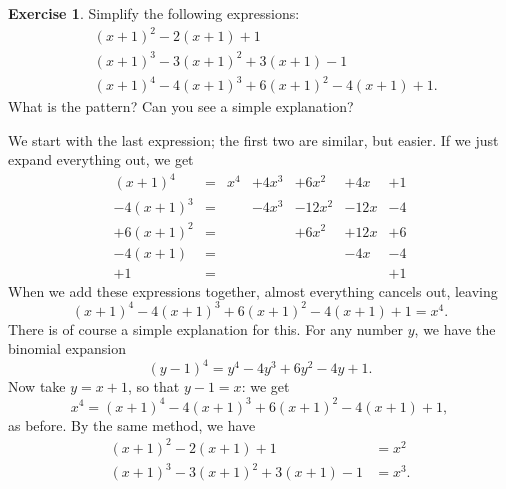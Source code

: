 \documentclass[a4paper]{book}
\renewcommand{\:}{\colon}
\theoremstyle{definition}
\newtheorem{exercise}[theorem]{Exercise}
\renewenvironment{solution}{\SolutionInline}{\endSolutionInline}
\begin{document}
\begin{exercise}
 Simplify the following expressions:
 \begin{align*}
  & (x+1)^2 - 2(x+1) + 1 \\
  & (x+1)^3 - 3(x+1)^2 + 3(x+1) - 1 \\
  & (x+1)^4 - 4(x+1)^3 + 6(x+1)^2 - 4(x+1) + 1.
 \end{align*}
 What is the pattern?  Can you see a simple explanation?
\end{exercise}
\begin{solution}
 We start with the last expression; the first two are similar, but
 easier.  If we just expand everything out, we get
 \[ \begin{array}{lclllll}
   (x+1)^4   &=& x^4 & + 4x^3 & + 6x^2 & + 4x & + 1 \\
   -4(x+1)^3 &=&     & - 4x^3 & -12x^2 & -12x & - 4 \\
   +6(x+1)^2 &=&     &        & + 6x^2 & +12x & + 6 \\
   -4(x+1)   &=&     &        &        & - 4x & - 4 \\
   +1        &=&     &        &        &      & + 1
 \end{array} \]
 When we add these expressions together, almost everything cancels
 out, leaving
 \[ (x+1)^4 - 4(x+1)^3 + 6(x+1)^2 - 4(x+1) + 1 = x^4. \]
 There is of course a simple explanation for this.  For any number
 $y$, we have the binomial expansion
 \[ (y-1)^4 = y^4 - 4y^3 + 6y^2 - 4y + 1. \]
 Now take $y=x+1$, so that $y-1=x$: we get
 \[ x^4 = (x+1)^4 - 4(x+1)^3 + 6(x+1)^2 - 4(x+1) + 1, \]
 as before.  By the same method, we have
 \begin{align*}
  (x+1)^2 - 2(x+1) + 1            &= x^2 \\
  (x+1)^3 - 3(x+1)^2 + 3(x+1) - 1 &= x^3.
 \end{align*}
\end{solution}
\end{document}
